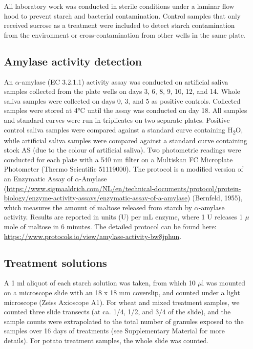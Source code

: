 \documentclass[utf8]{../templates/frontiersSCNS}
\begin{document}
All laboratory work was conducted in sterile conditions under a laminar flow hood
to prevent starch and bacterial contamination. Control samples that only received
sucrose as a treatment were included to detect starch contamination from the
environment or cross-contamination from other wells in the same plate.

\hypertarget{amylase-activity-detection}{%
\subsection{Amylase activity detection}\label{amylase-activity-detection}}

An \(\alpha\)-amylase (EC 3.2.1.1) activity assay was conducted on artificial
saliva samples collected from the plate wells on days 3, 6, 8, 9, 10, 12, and 14.
Whole saliva samples were collected on days 0, 3, and 5 as positive controls.
Collected samples were stored at 4°C until the assay was conducted on day 18.
All samples and standard curves were run in triplicates on two separate plates.
Positive control saliva samples were compared against a standard curve containing
H\textsubscript{2}O, while artificial saliva samples were compared against a standard curve
containing stock AS (due to the colour of artificial saliva).
Two photometric readings were conducted for each plate with a 540 nm filter on a
Multiskan FC Microplate Photometer (Thermo Scientific 51119000).
The protocol is a modified version of an Enzymatic Assay of \(\alpha\)-Amylase
(\url{https://www.sigmaaldrich.com/NL/en/technical-documents/protocol/protein-biology/enzyme-activity-assays/enzymatic-assay-of-a-amylase}) (Bernfeld, 1955), which measures the amount of
maltose released from starch by \(\alpha\)-amylase activity. Results are reported
in units (U) per mL enzyme, where 1 U releases 1 \(\mu\)mole of maltose in 6 minutes.
The detailed protocol can be found here: \url{https://www.protocols.io/view/amylase-activity-bw8jphun}.

\hypertarget{treatment-solutions}{%
\subsection{Treatment solutions}\label{treatment-solutions}}

A 1 ml aliquot of each starch solution was taken, from which 10 \(\mu\)l was mounted
on a microscope slide with an 18 x 18 mm coverslip, and counted under a light microscope
(Zeiss Axioscope A1). For wheat and mixed treatment samples, we counted three
slide transects (at ca. 1/4, 1/2, and 3/4 of the slide), and the sample counts
were extrapolated to the total number of granules exposed to the samples over 16
days of treatments (see Supplementary Material for more details). For potato
treatment samples, the whole slide was counted.
\end{document}
